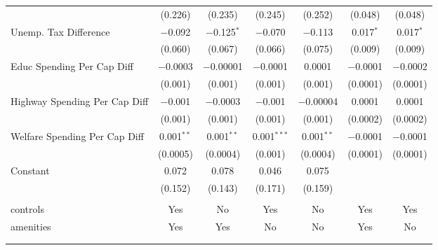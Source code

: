 \begin{table}[!htbp]
\begin{tabular}{@{\extracolsep{5pt}}lcccccc}
  & (0.226) & (0.235) & (0.245) & (0.252) & (0.048) & (0.048) \\ 
  Unemp. Tax Difference & $-$0.092 & $-$0.125$^{*}$ & $-$0.070 & $-$0.113 & 0.017$^{*}$ & 0.017$^{*}$ \\ 
  & (0.060) & (0.067) & (0.066) & (0.075) & (0.009) & (0.009) \\ 
  Educ Spending Per Cap Diff & $-$0.0003 & $-$0.00001 & $-$0.0001 & 0.0001 & $-$0.0001 & $-$0.0002 \\ 
  & (0.001) & (0.001) & (0.001) & (0.001) & (0.0001) & (0.0001) \\ 
  Highway Spending Per Cap Diff & $-$0.001 & $-$0.0003 & $-$0.001 & $-$0.00004 & 0.0001 & 0.0001 \\ 
  & (0.001) & (0.001) & (0.001) & (0.001) & (0.0002) & (0.0002) \\ 
  Welfare Spending Per Cap Diff & 0.001$^{**}$ & 0.001$^{**}$ & 0.001$^{***}$ & 0.001$^{**}$ & $-$0.0001 & $-$0.0001 \\ 
  & (0.0005) & (0.0004) & (0.001) & (0.0004) & (0.0001) & (0.0001) \\ 
  Constant & 0.072 & 0.078 & 0.046 & 0.075 &  &  \\ 
  & (0.152) & (0.143) & (0.171) & (0.159) &  &  \\ 
 \hline \\[-1.8ex] 
controls & Yes & No & Yes & No & Yes & Yes \\ 
amenities & Yes & Yes & No & No & Yes & No \\ 
\hline \\[-1.8ex] 
\hline 
\hline \\[-1.8ex] 
\end{tabular} 
\end{table} 
